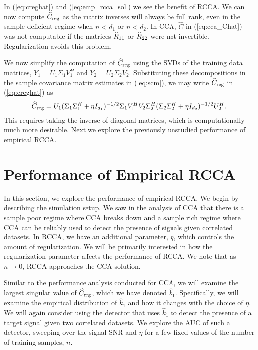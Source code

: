 In (\ref{eq:creghat}) and (\ref{eq:emp_rcca_sol}) we see the benefit of RCCA. We can now
compute $\widehat{C}_{\text{reg}}$ as the matrix inverses will always be full rank, even in the sample
deficient regime when $n<d_1$ or $n<d_2$. In CCA, $\widehat{C}$ in (\ref{eq:cca_Chat}) was
not computable if the matrices $\widehat{R}_{11}$ or $\widehat{R}_{22}$ were not invertible. Regularization
avoids this problem. 

We now simplify the computation of $\widehat{C}_{\text{reg}}$ using the SVDs of the training data
matrices, $Y_1 = U_1\Sigma_1V_1^H$ and $Y_2= U_2\Sigma_2V_2$. Substituting these
decompositions in the sample covariance matrix estimates in (\ref{eq:scm}), we may write
$\widehat{C}_{\text{reg}}$ in (\ref{eq:creghat}) as
\begin{equation}\label{eq:rcca_chat_decomp}
\widehat{C}_{\text{reg}} = U_1(\Sigma_1\Sigma_1^H+ \eta
I_{d_1})^{-1/2}\Sigma_1V_1^HV_2\Sigma_2^H(\Sigma_2\Sigma_2^H + \eta I_{d_2})^{-1/2}U_2^H.
\end{equation}
This requires taking the inverse of diagonal matrices, which is computationally much more
desirable. Next we explore the previously unstudied performance of empirical RCCA.

\section{Performance of Empirical RCCA}

In this section, we explore the performance of empirical RCCA. We begin by describing the
simulation setup. We saw in the analysis of CCA that there is a sample poor regime where
CCA breaks down and a sample rich regime where CCA can be reliably used to detect the
presence of signals given correlated datasets. In RCCA, we have an additional parameter, $\eta$,
which controls the amount of regularization. We will be primarily interested in how
the regularization parameter affects the performance of RCCA. We note that as $n\to 0$,
RCCA approaches the CCA solution.

Similar to the performance analysis conducted for CCA, we will examine the largest
singular value of $\widehat{C}_{\text{reg}}$, which we have denoted $\widehat{k}_1$. Specifically, we
will examine the empirical distribution of $\widehat{k}_1$ and how it changes with the
choice of $\eta$. We will again consider using the \naive detector that uses $\widehat{k}_1$
to detect the presence of a target signal given two correlated datasets. We explore the
AUC of such a detector, sweeping over the signal SNR and $\eta$ for a few fixed values of
the number of training samples, $n$.

